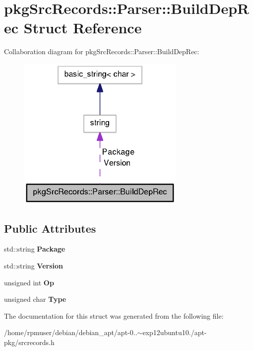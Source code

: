 \section{pkg\-Src\-Records\-:\-:\-Parser\-:\-:\-Build\-Dep\-Rec \-Struct \-Reference}
\label{structpkgSrcRecords_1_1Parser_1_1BuildDepRec}


\-Collaboration diagram for pkg\-Src\-Records\-:\-:\-Parser\-:\-:\-Build\-Dep\-Rec\-:
\nopagebreak
\begin{figure}[H]
\begin{center}
\leavevmode
\includegraphics[width=230pt]{structpkgSrcRecords_1_1Parser_1_1BuildDepRec__coll__graph}
\end{center}
\end{figure}
\subsection*{\-Public \-Attributes}
\begin{DoxyCompactItemize}
\item 
std\-::string {\bfseries \-Package}\label{structpkgSrcRecords_1_1Parser_1_1BuildDepRec_a06226e54c9e5df60b2c5898e6e382929}

\item 
std\-::string {\bfseries \-Version}\label{structpkgSrcRecords_1_1Parser_1_1BuildDepRec_a9128f413b7890b2493b88f88fe258259}

\item 
unsigned int {\bfseries \-Op}\label{structpkgSrcRecords_1_1Parser_1_1BuildDepRec_ac03b7f1c89d4abc92f5c66ba3130748a}

\item 
unsigned char {\bfseries \-Type}\label{structpkgSrcRecords_1_1Parser_1_1BuildDepRec_aa8450776ab620f8870aaee14ac1747fe}

\end{DoxyCompactItemize}


\-The documentation for this struct was generated from the following file\-:\begin{DoxyCompactItemize}
\item 
/home/rpmuser/debian/debian\-\_\-apt/apt-\/0..$\sim$exp12ubuntu10./apt-\/pkg/srcrecords.\-h\end{DoxyCompactItemize}
